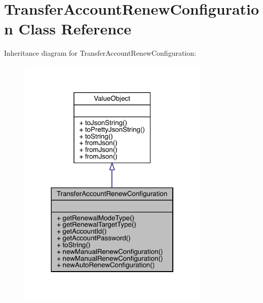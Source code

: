 \hypertarget{classcom_1_1toast_1_1android_1_1gamebase_1_1auth_1_1transfer_1_1data_1_1_transfer_account_renew_configuration}{}\section{Transfer\+Account\+Renew\+Configuration Class Reference}
\label{classcom_1_1toast_1_1android_1_1gamebase_1_1auth_1_1transfer_1_1data_1_1_transfer_account_renew_configuration}


Inheritance diagram for Transfer\+Account\+Renew\+Configuration\+:
\nopagebreak
\begin{figure}[H]
\begin{center}
\leavevmode
\includegraphics[width=260pt]{classcom_1_1toast_1_1android_1_1gamebase_1_1auth_1_1transfer_1_1data_1_1_transfer_account_renew_configuration__inherit__graph}
\end{center}
\end{figure}


